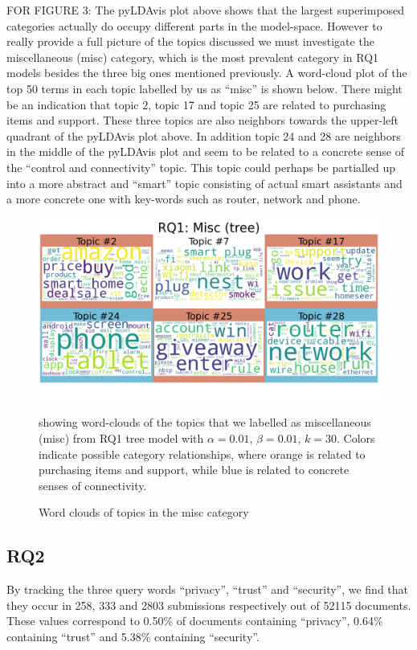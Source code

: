 \documentclass{article}
\begin{document}
    FOR FIGURE 3: 
The pyLDAvis plot above shows that the largest superimposed categories actually do occupy different parts in the model-space. However to really provide a full picture of the topics discussed we must investigate the miscellaneous (misc) category, which is the most prevalent category in RQ1 models besides the three big ones mentioned previously. A word-cloud plot of the top 50 terms in each topic labelled by us as “misc” is shown below. There might be an indication that topic 2, topic 17 and topic 25 are related to purchasing items and support. These three topics are also neighbors towards the upper-left quadrant of the pyLDAvis plot above. In addition topic 24 and 28 are neighbors in the middle of the pyLDAvis plot and seem to be related to a concrete sense of the “control and connectivity” topic. This topic could perhaps be partialled up into a more abstract and “smart” topic consisting of actual smart assistants and a more concrete one with key-words such as router, network and phone. 

\begin{figure}[H]
    \begin{centering}
    \includegraphics[scale=0.3]{../Figure/tree_misc_red.png}
    \caption{Word clouds of topics in the misc category}
    \end{centering}
    \begin{footnotesize} 
        showing word-clouds of the topics that we labelled as miscellaneous (misc) from RQ1 tree model with $\alpha = 0.01$, $\beta = 0.01$, $k = 30$. Colors indicate possible category relationships, where orange is related to purchasing items and support, while blue is related to concrete senses of connectivity. 
    \end{footnotesize}
\end{figure}

    \subsection{RQ2}
    By tracking the three query words “privacy”, “trust” and “security”, we find that they occur in 258, 333 and 2803 submissions respectively out of 52115 documents. These values correspond to 0.50\% of documents containing “privacy”, 0.64\% containing “trust” and 5.38\% containing “security”. 
\end{document}
